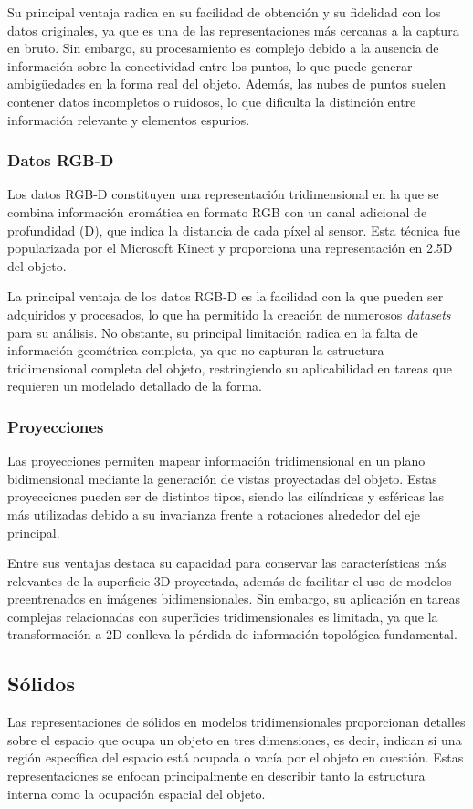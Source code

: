 Su principal ventaja radica en su facilidad de obtención y su fidelidad con los datos originales, ya que es una de las representaciones más cercanas a la captura en bruto. Sin embargo, su procesamiento es complejo debido a la ausencia de información sobre la conectividad entre los puntos, lo que puede generar ambigüedades en la forma real del objeto. Además, las nubes de puntos suelen contener datos incompletos o ruidosos, lo que dificulta la distinción entre información relevante y elementos espurios.

\subsubsection{Datos RGB-D}
Los datos RGB-D constituyen una representación tridimensional en la que se combina información cromática en formato RGB con un canal adicional de profundidad (D), que indica la distancia de cada píxel al sensor. Esta técnica fue popularizada por el Microsoft Kinect y proporciona una representación en 2.5D del objeto.

La principal ventaja de los datos RGB-D es la facilidad con la que pueden ser adquiridos y procesados, lo que ha permitido la creación de numerosos \textit{datasets} para su análisis. No obstante, su principal limitación radica en la falta de información geométrica completa, ya que no capturan la estructura tridimensional completa del objeto, restringiendo su aplicabilidad en tareas que requieren un modelado detallado de la forma.

\subsubsection{Proyecciones}
Las proyecciones permiten mapear información tridimensional en un plano bidimensional mediante la generación de vistas proyectadas del objeto. Estas proyecciones pueden ser de distintos tipos, siendo las cilíndricas y esféricas las más utilizadas debido a su invarianza frente a rotaciones alrededor del eje principal.

Entre sus ventajas destaca su capacidad para conservar las características más relevantes de la superficie 3D proyectada, además de facilitar el uso de modelos preentrenados en imágenes bidimensionales. Sin embargo, su aplicación en tareas complejas relacionadas con superficies tridimensionales es limitada, ya que la transformación a 2D conlleva la pérdida de información topológica fundamental.

\subsection{Sólidos}
Las representaciones de sólidos en modelos tridimensionales proporcionan detalles sobre el espacio que ocupa un objeto en tres dimensiones, es decir, indican si una región específica del espacio está ocupada o vacía por el objeto en cuestión. Estas representaciones se enfocan principalmente en describir tanto la estructura interna como la ocupación espacial del objeto.

